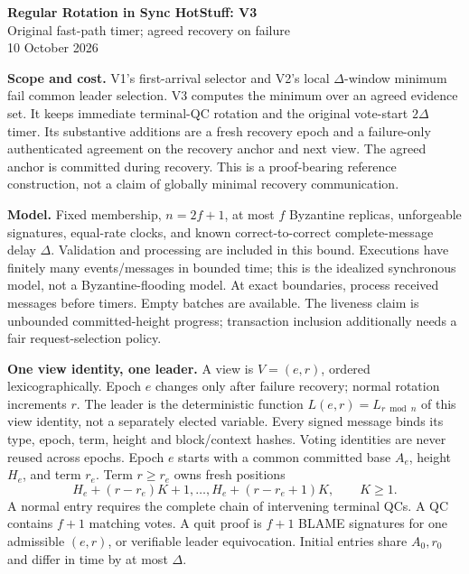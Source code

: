 \documentclass[10pt,a4paper]{article}
\begin{document}
\begin{center}
{\Large\bfseries Regular Rotation in Sync HotStuff: V3}\\[3pt]
{\large Original fast-path timer; agreed recovery on failure}\\[3pt]
10 October 2026
\end{center}

\textbf{Scope and cost.} V1's first-arrival selector and V2's local
$\Delta$-window minimum fail common leader selection. V3 computes the
minimum over an agreed evidence set. It keeps immediate terminal-QC
rotation and the original vote-start $2\Delta$ timer. Its substantive
additions are a fresh recovery epoch and a failure-only authenticated
agreement on the recovery anchor and next view. The agreed anchor is
committed during recovery. This is a proof-bearing reference construction,
not a claim of globally minimal recovery communication.

\textbf{Model.} Fixed membership, $n=2f+1$, at most $f$ Byzantine replicas,
unforgeable signatures, equal-rate clocks, and known correct-to-correct
complete-message delay $\Delta$. Validation and processing are included in
this bound. Executions have finitely many events/messages in bounded time;
this is the idealized synchronous model, not a Byzantine-flooding model.
At exact boundaries, process received messages before timers. Empty batches
are available. The liveness claim is unbounded committed-height progress;
transaction inclusion additionally needs a fair request-selection policy.

\textbf{One view identity, one leader.} A view is $V=(e,r)$, ordered
lexicographically. Epoch $e$ changes only after failure recovery; normal
rotation increments $r$. The leader is the deterministic function
$L(e,r)=L_{r\bmod n}$ of this view identity, not a separately elected variable.
Every signed message binds its type, epoch, term, height and block/context
hashes. Voting identities are never reused across epochs.
Epoch $e$ starts with a common committed base $A_e$, height $H_e$, and term
$r_e$. Term $r\ge r_e$ owns fresh positions
\[
 H_e+(r-r_e)K+1,\ldots,H_e+(r-r_e+1)K,\qquad K\ge1.
\]
A normal entry requires the complete chain of intervening terminal QCs.
A QC contains $f+1$ matching votes. A quit proof is $f+1$ BLAME signatures
for one admissible $(e,r)$, or verifiable leader equivocation. Initial
entries share $A_0,r_0$ and differ in time by at most $\Delta$.
\end{document}

